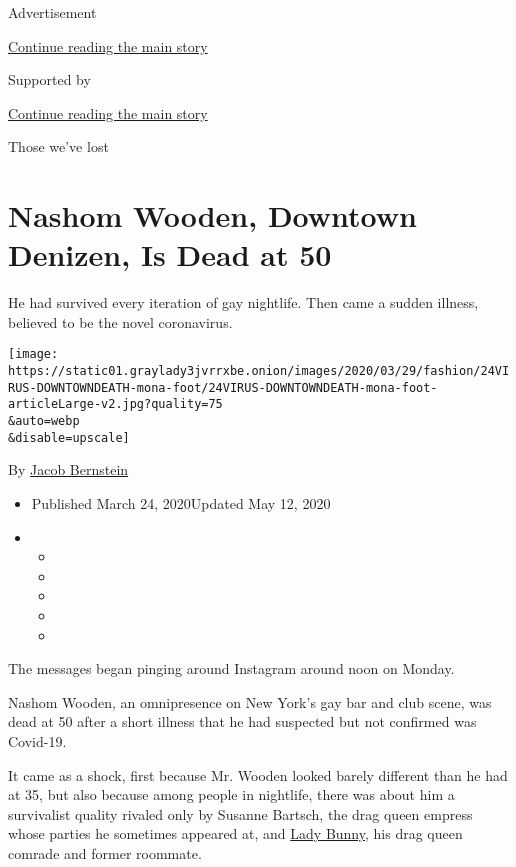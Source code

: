 Advertisement

\protect\hyperlink{after-top}{Continue reading the main story}

Supported by

\protect\hyperlink{after-sponsor}{Continue reading the main story}

Those we've lost

\hypertarget{nashom-wooden-downtown-denizen-is-dead-at-50}{%
\section{Nashom Wooden, Downtown Denizen, Is Dead at
50}\label{nashom-wooden-downtown-denizen-is-dead-at-50}}

He had survived every iteration of gay nightlife. Then came a sudden
illness, believed to be the novel coronavirus.

\texttt{[image: https://static01.graylady3jvrrxbe.onion/images/2020/03/29/fashion/24VIRUS-DOWNTOWNDEATH-mona-foot/24VIRUS-DOWNTOWNDEATH-mona-foot-articleLarge-v2.jpg?quality=75\\\&auto=webp\\\&disable=upscale]}

By \href{https://www.nytimes3xbfgragh.onion/by/jacob-bernstein}{Jacob
Bernstein}

\begin{itemize}
\item
  Published March 24, 2020Updated May 12, 2020
\item
  \begin{itemize}
  \item
  \item
  \item
  \item
  \item
  \end{itemize}
\end{itemize}

The messages began pinging around Instagram around noon on Monday.

Nashom Wooden, an omnipresence on New York's gay bar and club scene, was
dead at 50 after a short illness that he had suspected but not confirmed
was Covid-19.

It came as a shock, first because Mr. Wooden looked barely different
than he had at 35, but also because among people in nightlife, there was
about him a survivalist quality rivaled only by Susanne Bartsch, the
drag queen empress whose parties he sometimes appeared at, and
\href{https://www.nytimes3xbfgragh.onion/2018/09/29/style/lady-bunny-drag-queen.html}{Lady
Bunny}, his drag queen comrade and former roommate.

